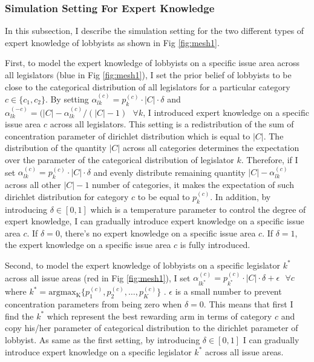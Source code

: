 \documentclass{article}
\begin{document}
\subsubsection{Simulation Setting For Expert Knowledge}
In this subsection, I describe the simulation setting for the two different types of expert knowledge of lobbyists
as shown in Fig \ref{fig:mesh1}.

First, to model the expert knowledge of lobbyists 
on a specific issue area across all legislators (blue in Fig \ref{fig:mesh1}),
I set the prior belief of lobbyists to be close to the categorical distribution of all legislators for a particular category $c \in \{c_1, c_2\}$.
By setting $\alpha_{lk}^{(c)} = p_k^{(c)} \cdot |C| \cdot \delta $ and $\alpha_{lk}^{(-c)} = (|C| - \alpha_{lk}^{(c)}/(|C|-1) \text{ } \forall k$, 
I introduced expert knowledge on a specific issue area $c$ across all legislators.
This setting is a redistribution of the sum of concentration parameter of dirichlet distribution which is equal to $|C|$.
The distribution of the quantity $|C|$ across all categories determines the expectation over 
the parameter of the categorical distribution of legislator $k$. 
Therefore, if I set $\alpha_{lk}^{(c)} = p_k^{(c)} \cdot |C| \cdot \delta $ 
and evenly distribute remaining quantity $|C| - \alpha_{lk}^{(c)}$ across all other $|C|-1$ number of categories,
it makes the expectation of such dirichlet distribution for category $c$ to be equal to $p_k^{(c)}$.
In addition, by introducing $\delta \in [0,1]$ which is a temperature parameter to control the degree of expert knowledge,
I can gradually introduce expert knowledge on a specific issue area $c$. If $\delta = 0$, there's no expert knowledge on a specific issue area $c$.
If $\delta = 1$, the expert knowledge on a specific issue area $c$ is fully introduced.

Second, to model the expert knowledge of lobbyists 
on a specific legislator $k^*$ across all issue areas (red in Fig \ref{fig:mesh1}),
I set $\alpha_{lk^*}^{(c)} = p_{k^*}^{(c)}\cdot |C| \cdot \delta + \epsilon \text{  } \forall c$ where $k^* = \operatorname{argmax_K}\{p_1^{(c)}, p_2^{(c)}, \hdots, p_K^{(c)}\}$ .
$\epsilon$ is a small number to prevent concentration parameters from being zero when $\delta = 0$.
This means that first I find the $k^*$ which represent the best rewarding arm in terms of category $c$ and 
copy his/her parameter of categorical distribution to the dirichlet parameter of lobbyist.
As same as the first setting, by introducing $\delta \in [0,1]$
I can gradually introduce expert knowledge on a specific legislator $k^*$ across all issue areas.
\end{document}
